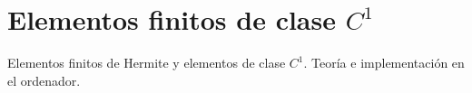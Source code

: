 
\section{Elementos finitos de clase $C^1$}

\begin{contenidos}
Elementos finitos de Hermite y elementos de clase $C^1$. Teoría e implementación en el ordenador.
\end{contenidos}



